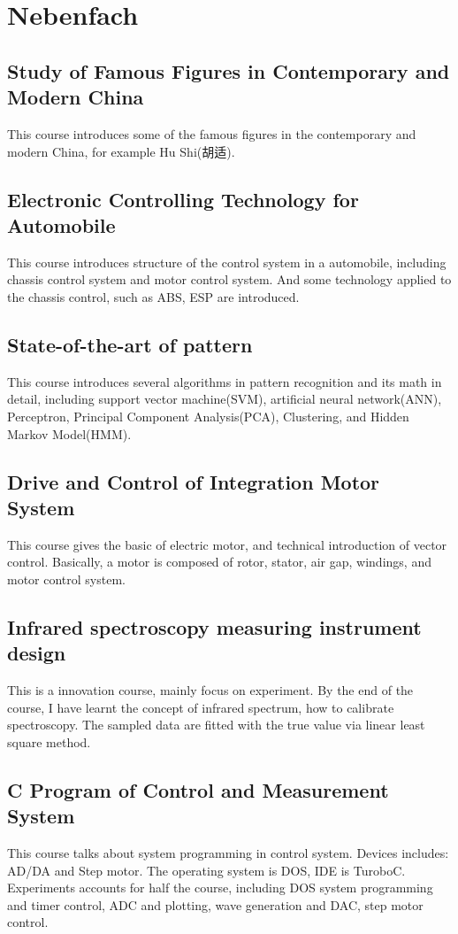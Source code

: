 \section{Nebenfach} 

\subsection{Study of Famous Figures in Contemporary and Modern China}
This course introduces some of the famous figures in the contemporary and modern China, for example Hu Shi(胡适).

\subsection{Electronic Controlling Technology for Automobile}
This course introduces structure of the control system in a automobile, including chassis control system and motor control system. And some technology applied to the chassis control, such as ABS, ESP are introduced.

\subsection{State-of-the-art of pattern}
This course introduces several algorithms in pattern recognition and its math in detail, including support vector machine(SVM), artificial neural network(ANN), Perceptron, Principal Component Analysis(PCA), Clustering, and Hidden Markov Model(HMM).

\subsection{Drive and Control of Integration Motor System}
This course gives the basic of electric motor, and technical introduction of vector control. Basically, a motor is composed of rotor, stator, air gap, windings, and motor control system.

\subsection{Infrared spectroscopy measuring instrument design}
This is a innovation course, mainly focus on experiment. By the end of the course, I have learnt the concept of infrared spectrum, how to calibrate spectroscopy. The sampled data are fitted with the true value via linear least square method.

\subsection{C Program of Control and Measurement System}
This course talks about system programming in control system. Devices includes: AD/DA and Step motor. The operating system is DOS, IDE is TuroboC. Experiments accounts for half the course, including DOS system programming and timer control, ADC and plotting, wave generation and DAC, step motor control.

